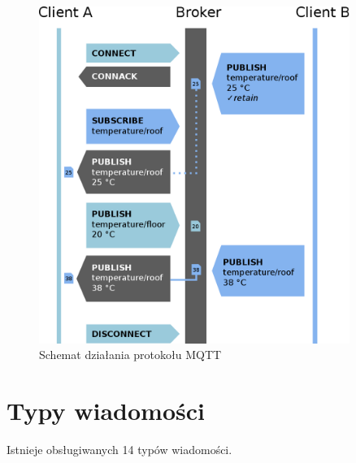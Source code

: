                     
        \begin{figure}[ht]
            \centering
            \includegraphics[width=0.9\textwidth]{img/mqtt_schematic.png}
            \caption{Schemat działania protokołu MQTT}
            \label{fig:mqtt_schematic}
        \end{figure}
         
        
    \section{Typy wiadomości}
        Istnieje obsługiwanych 14 typów wiadomości.
        

